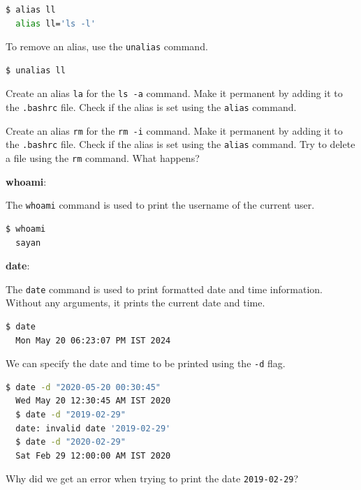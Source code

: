 \begin{lstlisting}[language=bash]
  $ alias ll
  alias ll='ls -l'
\end{lstlisting}

To remove an alias, use the \texttt{unalias} command.

\begin{lstlisting}[language=bash]
  $ unalias ll
\end{lstlisting}

\begin{exercise}
  Create an alias \texttt{la} for the \texttt{ls -a} command.
  Make it permanent by adding it to the \texttt{.bashrc} file.
  Check if the alias is set using the \texttt{alias} command.
\end{exercise}

\begin{exercise}
  Create an alias \texttt{rm} for the \texttt{rm -i} command.
  Make it permanent by adding it to the \texttt{.bashrc} file.
  Check if the alias is set using the \texttt{alias} command.
  Try to delete a file using the \texttt{rm} command.
  What happens?
\end{exercise}

\textbf{whoami}:

The \texttt{whoami} command is used to print the username of the current user.

\begin{lstlisting}[language=bash]
  $ whoami
  sayan
\end{lstlisting}

\textbf{date}:

The \texttt{date} command is used to print formatted date and time information.
Without any arguments, it prints the current date and time.

\begin{lstlisting}[language=bash]
  $ date
  Mon May 20 06:23:07 PM IST 2024
\end{lstlisting}

We can specify the date and time to be printed using the \texttt{-d} flag.

\begin{lstlisting}[language=bash]
  $ date -d "2020-05-20 00:30:45"
  Wed May 20 12:30:45 AM IST 2020
  $ date -d "2019-02-29"
  date: invalid date '2019-02-29'
  $ date -d "2020-02-29"
  Sat Feb 29 12:00:00 AM IST 2020
\end{lstlisting}

\begin{exercise}
  Why did we get an error when trying to print the date \texttt{2019-02-29}?
\end{exercise}


